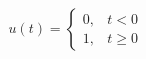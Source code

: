 \documentclass[preview]{standalone}
\begin{document}
\begin{align*}
u(t) = \begin{cases} 0, &  t < 0 \\ 1, &  t \geq 0 \end{cases}
\end{align*}
\end{document}
